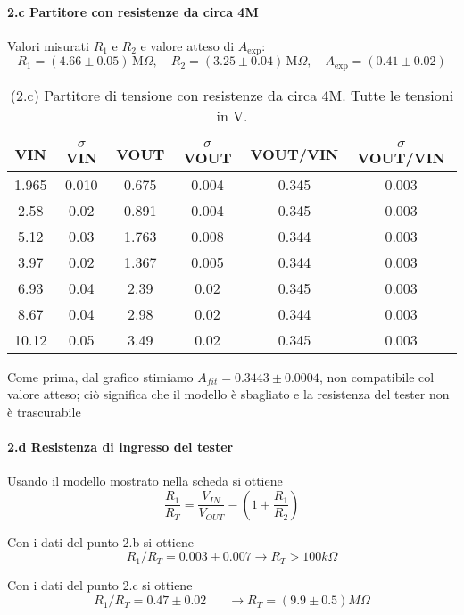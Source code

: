 \documentclass[10pt,a4paper]{article}
\newcommand{\exn}{\phantom{xxx}}
\begin{document}
\paragraph{2.c Partitore con resistenze da circa 4M}
Valori misurati $R_1$ e $R_2$ e valore atteso di $A_\mathrm{exp}$:
\[
R_1 = ( 4.66 \pm 0.05 ) \,\mathrm{M}\Omega, \quad
R_2 = ( 3.25 \pm 0.04 ) \,\mathrm{M}\Omega, \quad
A_\mathrm{exp} = ( 0.41 \pm0.02 ) 
\]


\begin{table}[h]
\centering
\begin{tabular}{|c|c|c|c|c|c|}
\hline 
VIN& $\sigma$ VIN  &VOUT	 & $\sigma$ VOUT& VOUT/VIN & $\sigma$ VOUT/VIN \\
\hline 
1.965 & 0.010 & 0.675 & 0.004 & 0.345 & 0.003 \\
2.58 & 0.02 & 0.891 & 0.004 & 0.345 & 0.003 \\
5.12 & 0.03 & 1.763 & 0.008 & 0.344 & 0.003 \\
3.97 & 0.02 & 1.367 & 0.005 & 0.344 & 0.003 \\
6.93 & 0.04 & 2.39 & 0.02 & 0.345 & 0.003 \\
8.67 & 0.04 & 2.98 & 0.02 & 0.344 & 0.003 \\
10.12 & 0.05 & 3.49 & 0.02 & 0.345 & 0.003\\


\hline 
\end{tabular} 
\caption{(2.c) Partitore di tensione con resistenze da circa 4M. Tutte le tensioni in V.\label{t:par2}}
\end{table}




Come prima, dal grafico stimiamo $A_{fit}=0.3443\pm0.0004$, non compatibile col valore atteso; ciò significa che il modello è sbagliato e la resistenza del tester non è trascurabile



\paragraph{2.d Resistenza di ingresso del tester}
Usando il modello mostrato nella scheda si ottiene
\[ \frac{R_1}{R_T} =  \frac{V_{IN}}{V_{OUT}} - (1 +  \frac{R_1}{R_2} )
\]

Con i dati del punto 2.b si ottiene
\[ R_1/R_T = 0.003 \pm  0.007   \rightarrow  R_T > 100 k\Omega
\]


Con i dati del punto 2.c si ottiene
\[ R_1/R_T = 0.47  \pm0.02  \exn   \rightarrow  R_T = (9.9 \pm  0.5)  M\Omega
\]
\end{document}
